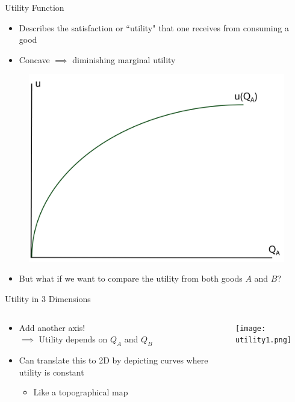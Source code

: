 \documentclass[9pt, handout]{beamer}
\begin{document}
\begin{frame}{Utility Function}
\begin{itemize}
    \item Describes the satisfaction or ``utility" that one receives from consuming a good
    \item Concave $\implies$ diminishing marginal utility
\end{itemize}
    \begin{figure}
        \centering
        \includegraphics[width=0.5\linewidth]{utility_function.png}
    \end{figure}
    \begin{itemize}
        \item But what if we want to compare the utility from both goods $A$ and $B$?
    \end{itemize}
\end{frame}

\begin{frame}{Utility in 3 Dimensions}
\begin{columns}[c]
\begin{column}{0.5\textwidth}
\begin{itemize}
    \item Add another axis!\\
    $\implies$ Utility depends on $Q_A$ and $Q_B$
    \vspace{5pt}
    \item Can translate this to 2D by depicting curves where utility is constant
    \vspace{5pt}
    \begin{itemize}
        \item Like a topographical map
    \end{itemize}
\end{itemize}
\end{column}
\begin{column}{0.5\textwidth}
    \texttt{[image: utility1.png]}
    \end{column}
\end{columns}
\end{frame}
\end{document}
